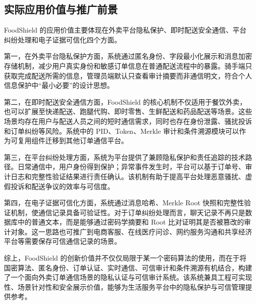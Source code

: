 \subsection{实际应用价值与推广前景}

FoodShield 的应用价值主要体现在外卖平台隐私保护、即时配送安全通信、平台纠纷处理和电子证据可信化四个方面。

第一，在外卖平台隐私保护方面，系统通过匿名身份、字段最小化展示和消息加密存储机制，减少用户真实身份和敏感订单信息在普通配送流程中的暴露。骑手端只获取完成配送所需的信息，管理员端默认只查看审计摘要而非通信明文，符合个人信息保护中“最小必要”的设计思想。

第二，在即时配送安全通信方面，FoodShield 的核心机制不仅适用于餐饮外卖，也可以扩展至快递配送、跑腿代购、即时零售、生鲜配送和药品配送等场景。这些场景均存在用户与配送人员之间的短时通信需求，同时也存在身份泄露、骚扰投诉和订单纠纷等风险。系统中的 PID、Token、Merkle 审计和条件溯源模块可以作为可复用组件迁移到其他订单通信平台。

第三，在平台纠纷处理方面，系统为平台提供了兼顾隐私保护和责任追踪的技术路径。日常通信中，用户身份得到保护；异常事件发生时，平台可以基于订单号、审计日志和完整性验证结果进行责任确认。该机制有助于提高平台处理恶意骚扰、虚假投诉和配送争议的效率与可信度。

第四，在电子证据可信化方面，系统通过消息哈希、Merkle Root 快照和完整性验证机制，使通信记录具备可验证性。对于订单纠纷处理而言，聊天记录不再只是数据库中的普通文本，而是能够通过密码学摘要和 Root 比对证明其是否被篡改的审计对象。这一思路也可推广到电商客服、在线医疗问诊、网约服务沟通和共享经济平台等需要保存可信通信记录的场景。

综上，FoodShield 的创新价值并不仅仅局限于某一个密码算法的使用，而在于将国密算法、匿名身份、订单认证、实时通信、可信审计和条件溯源有机结合，构建了一个面向外卖订单通信场景的隐私认证与可信审计系统。该系统兼具工程可实现性、场景针对性和安全展示价值，能够为生活服务平台中的隐私保护与可信管理提供参考。
